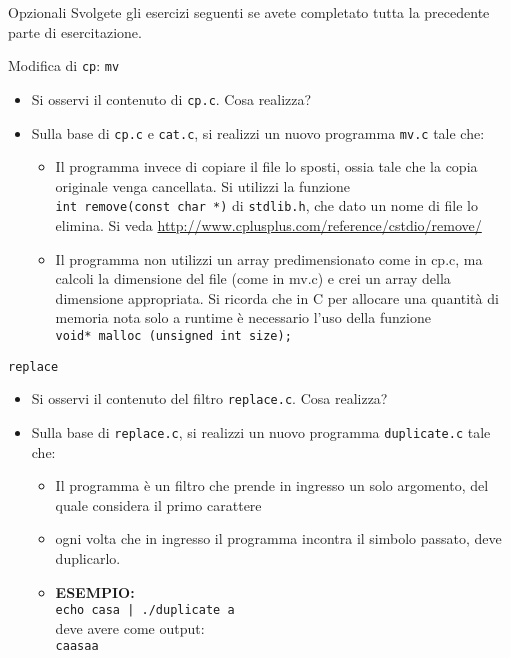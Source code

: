 \documentclass{beamer}
\begin{document}
\begin{frame}[fragile]{Opzionali}
Svolgete gli esercizi seguenti se avete completato tutta la precedente parte di esercitazione.
\end{frame}

\begin{frame}[fragile]{Modifica di \texttt{cp}: \texttt{mv}}
\begin{itemize}
 \item Si osservi il contenuto di \texttt{cp.c}. Cosa realizza?
 \item Sulla base di \texttt{cp.c} e \texttt{cat.c}, si realizzi un nuovo programma \texttt{mv.c} tale che:
 \begin{itemize}
  \item Il programma invece di copiare il file lo sposti, ossia tale che la copia originale venga cancellata. Si utilizzi la funzione \\ \texttt{int remove(const char *)} di \texttt{stdlib.h}, che dato un nome di file lo elimina. Si veda \url{http://www.cplusplus.com/reference/cstdio/remove/}
  \item Il programma non utilizzi un array predimensionato come in cp.c, ma calcoli la dimensione del file (come in mv.c) e crei un array della dimensione appropriata. Si ricorda che in C per allocare una quantità di memoria nota solo a runtime è necessario l'uso della funzione \\ \texttt{void* malloc (unsigned int size);}
 \end{itemize}
\end{itemize}
\end{frame}

\begin{frame}[fragile]{\texttt{replace}}
\begin{itemize}
 \item Si osservi il contenuto del filtro \texttt{replace.c}. Cosa realizza?
 \item Sulla base di \texttt{replace.c}, si realizzi un nuovo programma \texttt{duplicate.c} tale che:
 \begin{itemize}
  \item Il programma è un filtro che prende in ingresso un solo argomento, del quale considera il primo carattere
  \item ogni volta che in ingresso il programma incontra il simbolo passato, deve duplicarlo.
  \item \textbf{ESEMPIO:} \\ \texttt{echo casa | ./duplicate a} \\ deve avere come output: \\ \texttt{caasaa}
 \end{itemize}
\end{itemize}
\end{frame}
\end{document}
